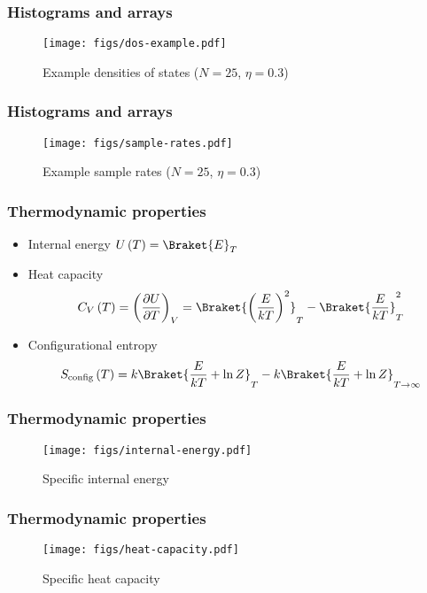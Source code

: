 \documentclass{beamer}
\newcommand{\bk}{\Braket} %
\newcommand{\p}[1]{\left(#1\right)} %
\newcommand{\f}[2]{\dfrac{#1}{#2}}
\renewcommand{\d}{\partial}
\let\olditem\item
\renewcommand{\item}{\setlength{\itemsep}{6pt}\olditem}
\begin{document}
\begin{frame}
  \frametitle{Histograms and arrays}
  \begin{figure}
    \centering
    \texttt{[image: figs/dos-example.pdf]}
    \caption{Example densities of states ($N=25$, $\eta=0.3$)}
  \end{figure}
\end{frame}

\begin{frame}
  \frametitle{Histograms and arrays}
  \begin{figure}
    \centering
    \texttt{[image: figs/sample-rates.pdf]}
    \caption{Example sample rates ($N=25$, $\eta=0.3$)}
  \end{figure}
\end{frame}

\begin{frame}
  \frametitle{Thermodynamic properties}
  \begin{itemize}
  \item Internal energy $U\p{T}=\bk{E}_T$
  \item Heat capacity
    \begin{align*}
      C_V\p{T}=\p{\f{\d U}{\d T}}_V
      =\bk{\p{\f{E}{kT}}^2}_T-\bk{\f{E}{kT}}_T^2
    \end{align*}
  \item Configurational entropy
  \begin{align*}
    S_{\text{config}}\p{T} =k\bk{\f{E}{kT}+\ln Z}_T
    -k\bk{\f{E}{kT}+\ln Z}_{T\to\infty}
  \end{align*}
  \end{itemize}
\end{frame}

\begin{frame}
  \frametitle{Thermodynamic properties}
  \begin{figure}
    \centering
    \texttt{[image: figs/internal-energy.pdf]}
    \caption{Specific internal energy}
  \end{figure}
\end{frame}

\begin{frame}
  \frametitle{Thermodynamic properties}
  \begin{figure}
    \centering
    \texttt{[image: figs/heat-capacity.pdf]}
    \caption{Specific heat capacity}
  \end{figure}
\end{frame}
\end{document}
